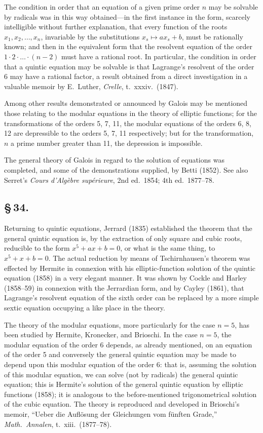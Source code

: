 \documentclass[11pt,a4paper]{article}
\begin{document}
The condition in order that an equation of a given prime order $n$ may be solvable by radicals was in this way obtained---in the first instance in the form, scarcely intelligible without further explanation, that every function of the roots $x_{1}, x_{2}, \ldots, x_{n}$, invariable by the substitutions $x_{s} \mapsto ax_{s} + b$, must be rationally known; and then in the equivalent form that the resolvent equation of the order $1 \cdot 2 \cdot \ldots \cdot (n - 2)$ must have a rational root. In particular, the condition in order that a quintic equation may be solvable is that Lagrange's resolvent of the order 6 may have a rational factor, a result obtained from a direct investigation in a valuable memoir by E.\ Luther, \textit{Crelle}, t.~xxxiv.\ (1847).

Among other results demonstrated or announced by Galois may be mentioned those relating to the modular equations in the theory of elliptic functions; for the transformations of the orders 5, 7, 11, the modular equations of the orders 6, 8, 12 are depressible to the orders 5, 7, 11 respectively; but for the transformation, $n$ a prime number greater than 11, the depression is impossible.

The general theory of Galois in regard to the solution of equations was completed, and some of the demonstrations supplied, by Betti (1852). See also Serret's \textit{Cours d'Alg\`{e}bre sup\'{e}rieure}, 2nd ed.\ 1854; 4th ed.\ 1877--78.

\subsection*{\S\,34.}

Returning to quintic equations, Jerrard (1835) established the theorem that the general quintic equation is, by the extraction of only square and cubic roots, reducible to the form $x^{5} + ax + b = 0$, or what is the same thing, to $x^{5} + x + b = 0$. The actual reduction by means of Tschirnhausen's theorem was effected by Hermite in connexion with his elliptic-function solution of the quintic equation (1858) in a very elegant manner. It was shown by Cockle and Harley (1858--59) in connexion with the Jerrardian form, and by Cayley (1861), that Lagrange's resolvent equation of the sixth order can be replaced by a more simple sextic equation occupying a like place in the theory.

The theory of the modular equations, more particularly for the case $n = 5$, has been studied by Hermite, Kronecker, and Brioschi. In the case $n = 5$, the modular equation of the order 6 depends, as already mentioned, on an equation of the order 5 and conversely the general quintic equation may be made to depend upon this modular equation of the order 6: that is, assuming the solution of this modular equation, we can solve (not by radicals) the general quintic equation; this is Hermite's solution of the general quintic equation by elliptic functions (1858); it is analogous to the before-mentioned trigonometrical solution of the cubic equation. The theory is reproduced and developed in Brioschi's memoir, ``Ueber die Aufl\"{o}sung der Gleichungen vom f\"{u}nften Grade,'' \textit{Math.\ Annalen}, t.~xiii.\ (1877--78).
\end{document}
